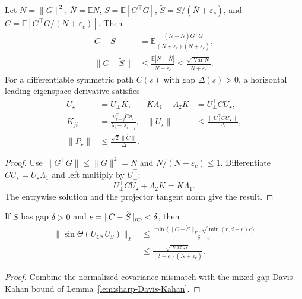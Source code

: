 \begin{lemma}
Let $N=\|G\|^2$, $\bar N=\mathbb EN$, $S=\mathbb E[G^\top G]$,
$\widetilde S=S/(\bar N+\varepsilon_c)$, and
$C=\mathbb E[G^\top G/(N+\varepsilon_c)]$. Then
\begin{align}
 C-\widetilde S
 &=\mathbb E\frac{(\bar N-N)G^\top G}
                  {(N+\varepsilon_c)(\bar N+\varepsilon_c)},\\
 \|C-\widetilde S\|
 &\le\frac{\mathbb E|N-\bar N|}{\bar N+\varepsilon_c}
 \le\frac{\sqrt{\operatorname{Var}N}}{\bar N+\varepsilon_c}.\label{eq:normalization-mismatch}
\end{align}
For a differentiable symmetric path $C(s)$ with gap $\Delta(s)>0$,
a horizontal leading-eigenspace derivative satisfies
\begin{align}
 \dot U_\star&=U_\perp K,&
 K\Lambda_1-\Lambda_2K&=U_\perp^\top\dot C U_\star,\\
 K_{ji}&=\frac{u_{r+j}^\top\dot C u_i}{\lambda_i-\lambda_{r+j}},&
 \|\dot U_\star\|&\le\frac{\|U_\perp^\top\dot C U_\star\|}{\Delta},\\
 \|\dot P_\star\|&\le\frac{\sqrt2\|\dot C\|}{\Delta}.\label{eq:sylvester-eigenspace}
\end{align}
\end{lemma}
\begin{proof}
Use $\|G^\top G\|\le\|G\|^2=N$ and $N/(N+\varepsilon_c)\le1$.
Differentiate $CU_\star=U_\star\Lambda_1$ and left multiply by
$U_\perp^\top$:
\begin{equation}
 U_\perp^\top\dot C U_\star+\Lambda_2K=K\Lambda_1.
\end{equation}
The entrywise solution and the projector tangent norm give the result.
\end{proof}

\begin{corollary}
If $\widetilde S$ has gap $\delta>0$ and
$e=\|C-\widetilde S\|_{\rm op}<\delta$, then
\begin{align}
 \|\sin\Theta(U_C,U_S)\|_F
 &\le\frac{\min\{\|C-\widetilde S\|_F,\sqrt{\min(r,d-r)}e\}}
                  {\delta-e}\\
 &\le\frac{\sqrt{\operatorname{Var}N}}
                {(\delta-e)(\bar N+\varepsilon_c)}.
 \label{eq:normalization-angle}
\end{align}
\end{corollary}
\begin{proof}
Combine the normalized-covariance mismatch with the mixed-gap
Davis--Kahan bound of Lemma~\ref{lem:sharp-Davis-Kahan}.
\end{proof}

